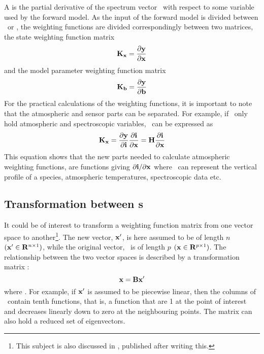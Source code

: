  A  is the partial derivative of the
 spectrum vector \MsrVct\ with respect to some variable used by the
 forward model. As the input of the forward model is divided between
 \SttVct\ or \FrwMdlVct, the weighting functions are divided
 correspondingly between two matrices, the state weighting function
 matrix
 \begin{equation}
   \mathbf{K}_{\mathbf{x}} = \frac{\partial \mathbf{y}}{\partial \mathbf{x}}
  \label{eq:formalism:kx}
 \end{equation}
 and the model parameter weighting function matrix
 \begin{equation}
   \mathbf{K}_{\mathbf{b}} = \frac{\partial \mathbf{y}}{\partial \mathbf{b}}
  \label{eq:formalism:kb}
 \end{equation}
 For the practical calculations of the weighting functions, it is
 important to note that the atmospheric and sensor parts can be
 separated. For example, if \SttVct\ only hold atmospheric and
 spectroscopic variables, \aWfnMtr{\SttVct}\ can be expressed as
 \begin{equation}
   \mathbf{K}_{\mathbf{x}} = \frac{\partial \mathbf{y}}{\partial \mathbf{i}}
                 \frac{\partial \mathbf{i}}{\partial \mathbf{x}} =
         \mathbf{H} \frac{\partial \mathbf{i}}{\partial \mathbf{x}}
  \label{eq:formalism:kx2}
 \end{equation}
 This equation shows that the new parts needed to calculate
 atmospheric weighting functions, are functions giving $\partial\mathbf{i} /
 \partial \mathbf{x}$ where \SttVct\ can represent the vertical profile of a
 species, atmospheric temperatures, spectroscopic data etc.


 \subsection{Transformation between s}
 
 It could be of interest to transform a weighting function matrix from
 one vector space to another\footnote{This subject is also discussed
   in \citet{rodgers:00}, published after writing this.}. The new
 vector, $\mathbf{x}'$, is here assumed to be of length $n$ $(\mathbf{x}' \in
 \mathbf{R}^{n \times 1})$, while the original vector, \SttVct\ is of length $p$
 $(\mathbf{x} \in \mathbf{R}^{p \times 1})$. The relationship between the two vector
 spaces is described by a transformation matrix \VctTrfMtr:
  \begin{equation}
    \mathbf{x} = \mathbf{B} \mathbf{x}'
  \end{equation}
  where \VctTrfMtr \SzeSmb {}. For example, if $\mathbf{x}'$
  is assumed to be piecewise linear, then the columns of \VctTrfMtr\ contain
  tenth functions, that is, a function that are 1 at the point of
  interest and decreases linearly down to zero at the neighbouring
  points.  The matrix can also hold a reduced set of eigenvectors.
    
